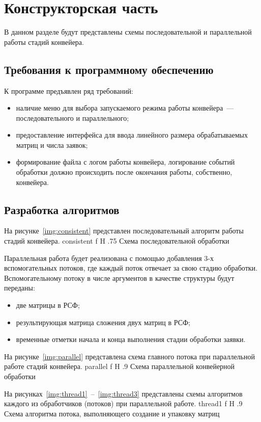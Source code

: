 \chapter{Конструкторская часть}
В данном разделе будут представлены схемы последовательной и параллельной работы стадий конвейера.

\section{Требования к программному обеспечению}
К программе предъявлен ряд требований:
\begin{itemize}
	\item наличие меню для выбора запускаемого режима работы конвейера~--- последовательного и параллельного;
	\item предоставление интерфейса для ввода линейного размера обрабатываемых матриц и числа заявок;
	\item формирование файла с логом работы конвейера, логирование событий обработки должно происходить после окончания работы, собственно, конвейера.
\end{itemize}

\section{Разработка алгоритмов}
На рисунке~\ref{img:consistent} представлен последовательный алгоритм работы стадий конвейера.
{consistent}
{f}
{H}
{.75\textwidth}
{Схема последовательной обработки}

Параллельная работа будет реализована с помощью добавления 3-х вспомогательных потоков, где каждый поток отвечает за свою стадию обработки.
Вспомогательному потоку в числе аргументов в качестве структуры будут переданы:
\begin{itemize}
	\item две матрицы в РСФ;
	\item результирующая матрица сложения двух матриц в РСФ;
	\item временные отметки начала и конца выполнения стадии обработки заявки.
\end{itemize}

На рисунке~\ref{img:parallel} представлена схема главного потока при параллельной работе стадий конвейера.
{parallel}
{f}
{H}
{.9\textwidth}
{Схема параллельной конвейерной обработки}

\newpage

На рисунках~\ref{img:thread1}~--~\ref{img:thread3} представлены схемы алгоритмов каждого из обработчиков (потоков) при параллельной работе.
{thread1}
{f}
{H}
{.9\textwidth}
{Схема алгоритма потока, выполняющего создание и упаковку матриц}

